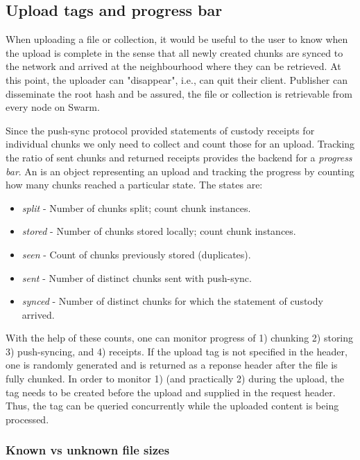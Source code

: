 \subsection{Upload tags and progress bar}\label{sec:tags}                                                                                        
When uploading a file or collection, it would be useful to the user to know when the upload is complete in the sense that all newly created chunks are synced to the network and arrived at the neighbourhood where they can be retrieved. At this point, the  uploader can "disappear",  i.e., can quit their client. Publisher can disseminate the root hash and be assured, the file or collection is retrievable from every node on Swarm. 

Since the push-sync protocol provided statements of custody receipts for individual chunks we only need to collect and count those for an upload. Tracking the ratio of sent chunks and returned receipts provides the backend for a \emph{progress bar}. An  is an object representing an upload and tracking the progress by counting how many chunks reached a particular state. The states are: 

\begin{itemize}
\item \emph{split} - Number of chunks split; count chunk instances.
\item \emph{stored} - Number of chunks stored locally; count chunk instances.
\item \emph{seen} - Count of chunks previously stored (duplicates).
\item \emph{sent} - Number of distinct chunks sent with push-sync.
\item \emph{synced} - Number of distinct chunks for which the statement of custody arrived.
\end{itemize}

With the help of these counts, one can monitor progress of 1) chunking 2) storing 3) push-syncing, and 4) receipts.
If the upload tag is not specified in the header, one is randomly generated and is returned as a reponse header after the file is fully chunked. In order to monitor 1) (and practically 2) during the upload, the tag needs to be created before the upload and supplied in the request header. Thus, the tag can be queried concurrently while the uploaded content is being processed. 

\subsubsection{Known vs unknown file sizes}

